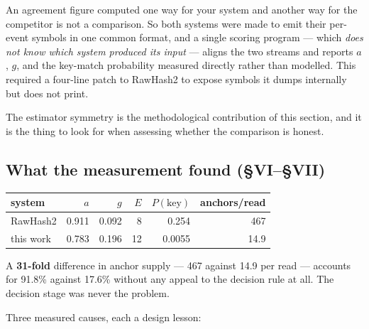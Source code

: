 \documentclass[11pt,a4paper]{article}
\begin{document}
An agreement figure computed one way for your system and another way for the competitor is
not a comparison. So both systems were made to emit their per-event symbols in one common
format, and a single scoring program --- which \emph{does not know which system produced its
input} --- aligns the two streams and reports $a$, $g$, and the key-match probability measured
directly rather than modelled. This required a four-line patch to RawHash2 to expose symbols
it dumps internally but does not print.

The estimator symmetry is the methodological contribution of this section, and it is the
thing to look for when assessing whether the comparison is honest.

\subsection*{What the measurement found \hfill\small(§VI--§VII)}

\begin{center}
\begin{tabular}{lrrrrr}
\toprule
system & $a$ & $g$ & $E$ & $P(\text{key})$ & anchors/read \\
\midrule
RawHash2  & 0.911 & 0.092 & 8  & 0.254  & 467 \\
this work & 0.783 & 0.196 & 12 & 0.0055 & 14.9 \\
\bottomrule
\end{tabular}
\end{center}

A \textbf{31-fold} difference in anchor supply --- 467 against 14.9 per read --- accounts for
91.8\% against 17.6\% without any appeal to the decision rule at all. The decision stage was
never the problem.

Three measured causes, each a design lesson:
\end{document}
